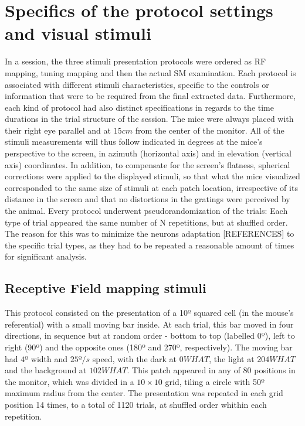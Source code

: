 \section{Specifics of the protocol settings and visual stimuli}
\label{sec:Specifics-of-the-protocol-settings-and-visual-stimuli}

In a session, the three stimuli presentation protocols were ordered as RF mapping, tuning mapping and then the actual SM examination.
Each protocol is associated with different stimuli characteristics, specific to the controls or information that were to be required from the final extracted data. Furthermore, each kind of protocol had also distinct specifications in regards to the time durations in the trial structure of the session.
The mice were always placed with their right eye parallel and at $15 cm$ from the center of the monitor. All of the stimuli measurements will thus follow indicated in degrees at the mice's perspective to the screen, in azimuth (horizontal axis) and in elevation (vertical axis) coordinates. In addition, to compensate for the screen's flatness, spherical corrections were applied to the displayed stimuli, so that what the mice visualized corresponded to the same size of stimuli at each patch location, irrespective of its distance in the screen and that no distortions in the gratings were perceived by the animal.
Every protocol underwent pseudorandomization of the trials: Each type of trial appeared the same number of N repetitions, but at shuffled order. The reason for this was to minimize the neurons adaptation [REFERENCES] to the specific trial types, as they had to be repeated a reasonable amount of times for significant analysis.

\subsection{Receptive Field mapping stimuli}
\label{subsec:subasectionC}

This protocol consisted on the presentation of a 10º squared cell (in the mouse's referential) with a small moving bar inside. At each trial, this bar moved in four directions, in sequence but at random order - bottom to top (labelled 0º), left to right (90º) and the opposite ones (180º and 270º, respectively). The moving bar had $4º$ width and $25 º/s$ speed, with the dark at $0 WHAT$, the light at $204 WHAT$ and the background at $102 WHAT$. This patch appeared in any of 80 positions in the monitor, which was divided in a $10 \times 10$ grid, tiling a circle with 50º maximum radius from the center. The presentation was repeated in each grid position 14 times, to a total of 1120 trials, at shuffled order whithin each repetition.

